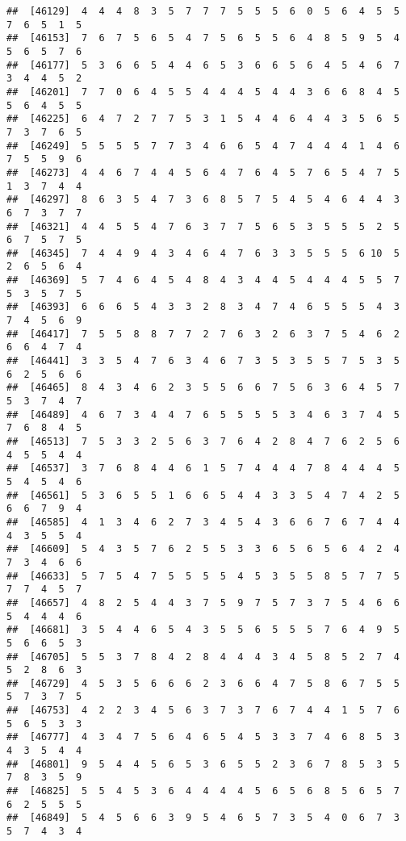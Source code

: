 \documentclass[
]{book}
\begin{document}
\begin{verbatim}
##  [46129]  4  4  4  8  3  5  7  7  7  5  5  5  6  0  5  6  4  5  5  7  6  5  1  5
##  [46153]  7  6  7  5  6  5  4  7  5  6  5  5  6  4  8  5  9  5  4  5  6  5  7  6
##  [46177]  5  3  6  6  5  4  4  6  5  3  6  6  5  6  4  5  4  6  7  3  4  4  5  2
##  [46201]  7  7  0  6  4  5  5  4  4  4  5  4  4  3  6  6  8  4  5  5  6  4  5  5
##  [46225]  6  4  7  2  7  7  5  3  1  5  4  4  6  4  4  3  5  6  5  7  3  7  6  5
##  [46249]  5  5  5  5  7  7  3  4  6  6  5  4  7  4  4  4  1  4  6  7  5  5  9  6
##  [46273]  4  4  6  7  4  4  5  6  4  7  6  4  5  7  6  5  4  7  5  1  3  7  4  4
##  [46297]  8  6  3  5  4  7  3  6  8  5  7  5  4  5  4  6  4  4  3  6  7  3  7  7
##  [46321]  4  4  5  5  4  7  6  3  7  7  5  6  5  3  5  5  5  2  5  6  7  5  7  5
##  [46345]  7  4  4  9  4  3  4  6  4  7  6  3  3  5  5  5  6 10  5  2  6  5  6  4
##  [46369]  5  7  4  6  4  5  4  8  4  3  4  4  5  4  4  4  5  5  7  5  3  5  7  5
##  [46393]  6  6  6  5  4  3  3  2  8  3  4  7  4  6  5  5  5  4  3  7  4  5  6  9
##  [46417]  7  5  5  8  8  7  7  2  7  6  3  2  6  3  7  5  4  6  2  6  6  4  7  4
##  [46441]  3  3  5  4  7  6  3  4  6  7  3  5  3  5  5  7  5  3  5  6  2  5  6  6
##  [46465]  8  4  3  4  6  2  3  5  5  6  6  7  5  6  3  6  4  5  7  5  3  7  4  7
##  [46489]  4  6  7  3  4  4  7  6  5  5  5  5  3  4  6  3  7  4  5  7  6  8  4  5
##  [46513]  7  5  3  3  2  5  6  3  7  6  4  2  8  4  7  6  2  5  6  4  5  5  4  4
##  [46537]  3  7  6  8  4  4  6  1  5  7  4  4  4  7  8  4  4  4  5  5  4  5  4  6
##  [46561]  5  3  6  5  5  1  6  6  5  4  4  3  3  5  4  7  4  2  5  6  6  7  9  4
##  [46585]  4  1  3  4  6  2  7  3  4  5  4  3  6  6  7  6  7  4  4  4  3  5  5  4
##  [46609]  5  4  3  5  7  6  2  5  5  3  3  6  5  6  5  6  4  2  4  7  3  4  6  6
##  [46633]  5  7  5  4  7  5  5  5  5  4  5  3  5  5  8  5  7  7  5  7  7  4  5  7
##  [46657]  4  8  2  5  4  4  3  7  5  9  7  5  7  3  7  5  4  6  6  5  4  4  4  6
##  [46681]  3  5  4  4  6  5  4  3  5  5  6  5  5  5  7  6  4  9  5  5  6  6  5  3
##  [46705]  5  5  3  7  8  4  2  8  4  4  4  3  4  5  8  5  2  7  4  5  2  8  6  3
##  [46729]  4  5  3  5  6  6  6  2  3  6  6  4  7  5  8  6  7  5  5  5  7  3  7  5
##  [46753]  4  2  2  3  4  5  6  3  7  3  7  6  7  4  4  1  5  7  6  5  6  5  3  3
##  [46777]  4  3  4  7  5  6  4  6  5  4  5  3  3  7  4  6  8  5  3  4  3  5  4  4
##  [46801]  9  5  4  4  5  6  5  3  6  5  5  2  3  6  7  8  5  3  5  7  8  3  5  9
##  [46825]  5  5  4  5  3  6  4  4  4  4  5  6  5  6  8  5  6  5  7  6  2  5  5  5
##  [46849]  5  4  5  6  6  3  9  5  4  6  5  7  3  5  4  0  6  7  3  5  7  4  3  4

\end{verbatim}
\end{document}
